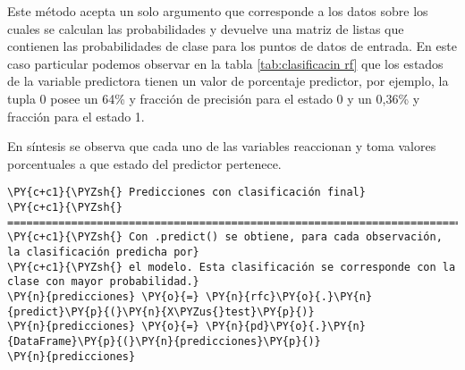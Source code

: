     Este método acepta un solo argumento que corresponde a los datos sobre
los cuales se calculan las probabilidades y devuelve una matriz de
listas que contienen las probabilidades de clase para los puntos de
datos de entrada. En este caso particular podemos observar en la tabla \ref{tab:clasificacin rf} que los
estados de la variable predictora tienen un valor de porcentaje
predictor, por ejemplo, la tupla 0 posee un 64\% y fracción de precisión
para el estado 0 y un 0,36\% y fracción para el estado 1.

En síntesis se observa que cada uno de las variables reaccionan y toma
valores porcentuales a que estado del predictor pertenece.

    \begin{tcolorbox}[breakable, size=fbox, boxrule=1pt, pad at break*=1mm,colback=cellbackground, colframe=cellborder]
\begin{Verbatim}[commandchars=\\\{\}]
\PY{c+c1}{\PYZsh{} Predicciones con clasificación final}
\PY{c+c1}{\PYZsh{} ==============================================================================}
\PY{c+c1}{\PYZsh{} Con .predict() se obtiene, para cada observación, la clasificación predicha por}
\PY{c+c1}{\PYZsh{} el modelo. Esta clasificación se corresponde con la clase con mayor probabilidad.}
\PY{n}{predicciones} \PY{o}{=} \PY{n}{rfc}\PY{o}{.}\PY{n}{predict}\PY{p}{(}\PY{n}{X\PYZus{}test}\PY{p}{)}
\PY{n}{predicciones} \PY{o}{=} \PY{n}{pd}\PY{o}{.}\PY{n}{DataFrame}\PY{p}{(}\PY{n}{predicciones}\PY{p}{)}
\PY{n}{predicciones}
\end{Verbatim}
\end{tcolorbox}

